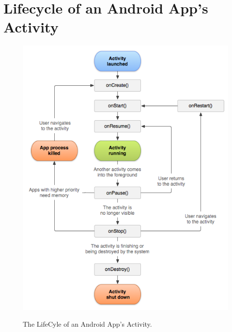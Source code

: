 \chapter{Lifecycle of an Android App's Activity}

\begin{figure}
	\centering
		\includegraphics[scale=0.90]{input/images/activity_lifecycle.png}
	\label{fig:activity_lifecycle}
	\caption{The LifeCyle of an Android App's Activity.\cite{androidlife}}
\end{figure}
